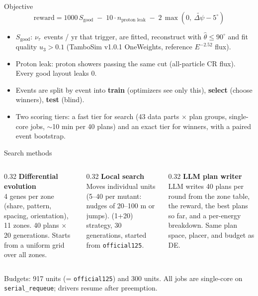 \documentclass[aspectratio=169,11pt]{beamer}
\newcommand{\nut}{$\nu_\tau$}
\begin{document}
\begin{frame}{Objective}
  \[
    \text{reward} = 1000\, S_{\text{good}} \;-\; 10 \cdot n_{\text{proton leak}} \;-\; 2\,\max(0,\ \widetilde{\Delta\psi} - 5^\circ)
  \]
  \begin{itemize}
    \item $S_{\text{good}}$: \nut\ events / yr that trigger, are fitted, reconstruct with $\hat\theta \le 90^\circ$ and fit quality $u_3 > 0.1$ (TamboSim v1.0.1 OneWeights, reference $E^{-2.52}$ flux).
    \item Proton leak: proton showers passing the same cut (all-particle CR flux). Every good layout leaks 0.
    \item Events are split by event into \textbf{train} (optimizers see only this), \textbf{select} (choose winners), \textbf{test} (blind).
    \item Two scoring tiers: a fast tier for search (43 data parts $\times$ plan groups, single-core jobs, $\sim$10 min per 40 plans) and an exact tier for winners, with a paired event bootstrap.
  \end{itemize}
\end{frame}



\begin{frame}{Search methods}
  \begin{columns}[T]
    \begin{column}{0.32\textwidth}
      \textbf{\color{accent}Differential evolution}\\[0.3em]\small
      4 genes per zone (share, pattern, spacing, orientation), 11 zones. 40 plans $\times$ 20 generations. Starts from a uniform grid over all zones.
    \end{column}
    \begin{column}{0.32\textwidth}
      \textbf{\color{aqua}Local search}\\[0.3em]\small
      Moves individual units (5--40 per mutant: nudges of 20--100 m or jumps). (1+20) strategy, 30 generations, started from \texttt{official125}.
    \end{column}
    \begin{column}{0.32\textwidth}
      \textbf{\color{aqua}LLM plan writer}\\[0.3em]\small
      LLM writes 40 plans per round from the zone table, the reward, the best plans so far, and a per-energy breakdown. Same plan space, placer, and budget as DE.
    \end{column}
  \end{columns}
  \vspace{1em}
  \small Budgets: 917 units (= \texttt{official125}) and 300 units. All jobs are single-core on \texttt{serial\_requeue}; drivers resume after preemption.
\end{frame}
\end{document}
